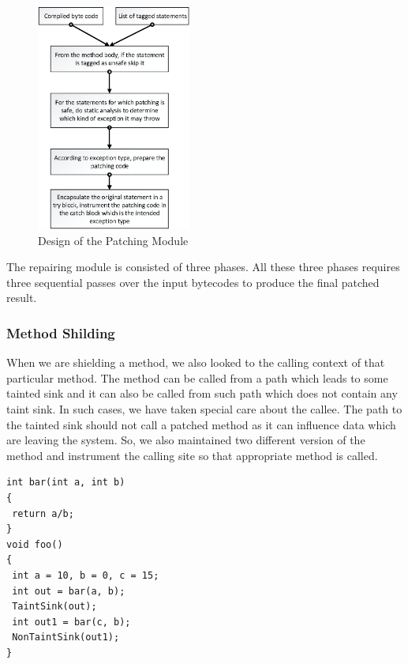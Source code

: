 \begin{figure}
\centering
  \includegraphics[width= 2.0in]{images/PatchModule.png}
  \caption{Design of the Patching Module}
  \label{fig:PatchModule}
\end{figure}

The repairing module is consisted of three phases. All these three phases
requires three sequential passes over the input bytecodes to produce the final
patched result.


\subsubsection{Method Shilding}
\label{MethodShilding}


When we are shielding a method, we also looked to the calling context of that
particular method. The method can be called from a path which leads to some
tainted sink and it can also be called from such path which does not contain
any taint sink. In such cases, we have taken special care about the callee. The
path to the tainted sink should not call a patched method as it can influence
data which are leaving the system. So, we also maintained two different version of
the method and instrument the calling site so that appropriate method is called.

\lstset{language=Java, caption = Same method calling in different scenario,
label=callingContext}
\begin{lstlisting}
int bar(int a, int b)
{
 return a/b;
}
void foo()
{
 int a = 10, b = 0, c = 15;
 int out = bar(a, b);
 TaintSink(out);
 int out1 = bar(c, b);
 NonTaintSink(out1);
}
\end{lstlisting}


\lstset{language=Java, caption = Mehod name modification for different calling
context, label=callingContextPatch}

